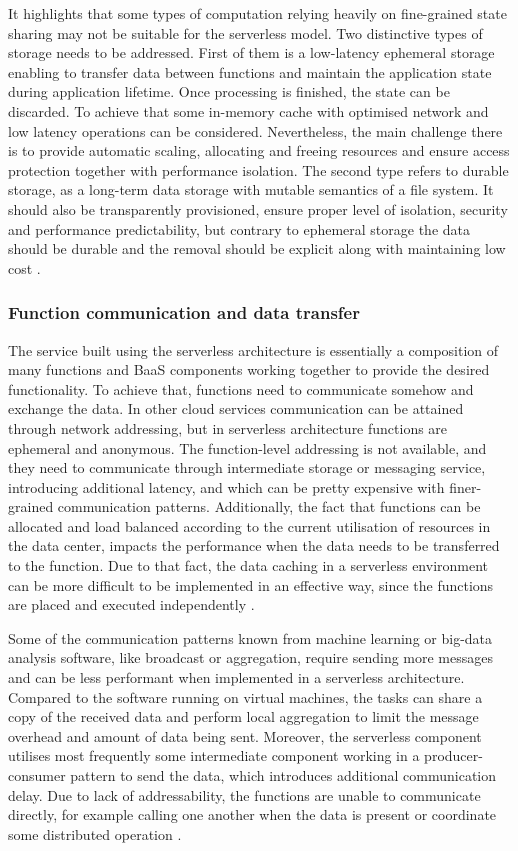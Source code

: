 It highlights that some types of computation relying heavily on fine-grained state sharing may not be suitable for the serverless model. Two distinctive types of storage needs to be addressed. First of them is a low-latency ephemeral storage enabling to transfer data between functions and maintain the application state during application lifetime. Once processing is finished, the state can be discarded. To achieve that some in-memory cache with optimised network and low latency operations can be considered. Nevertheless, the main challenge there is to provide automatic scaling, allocating and freeing resources and ensure access protection together with performance isolation. The second type refers to durable storage, as a long-term data storage with mutable semantics of a file system. It should also be transparently provisioned, ensure proper level of isolation, security and performance predictability, but contrary to ephemeral storage the data should be durable and the removal should be explicit along with maintaining low cost \cite{BerkeleyServerless}.

\subsubsection*{Function communication and data transfer}

The service built using the serverless architecture is essentially a composition of many functions and BaaS components working together to provide the desired functionality. To achieve that, functions need to communicate somehow  and exchange the data. In other cloud services communication can be attained through network addressing, but in serverless architecture functions are ephemeral and anonymous. The function-level addressing is not available, and they need to communicate through intermediate storage or messaging service, introducing additional latency, and which can be pretty expensive with finer-grained communication patterns. Additionally, the fact that functions can be allocated and load balanced according to the current utilisation of resources in the data center, impacts the performance when the data needs to be transferred to the function. Due to that fact, the data caching in a serverless environment can be more difficult to be implemented in an effective way, since the functions are placed and executed independently \cite{ServerlessComputingSurveyOfOpportunitiesChallengesApplications}.

Some of the communication patterns known from machine learning or big-data analysis software, like broadcast or aggregation, require sending more messages and can be less performant when implemented in a serverless architecture. Compared to the software running on virtual machines, the tasks can share a copy of the received data and perform local aggregation to limit the message overhead and amount of data being sent. Moreover, the serverless component utilises most frequently some intermediate component working in a producer-consumer pattern to send the data, which introduces additional communication delay. Due to lack of addressability, the functions are unable to communicate directly, for example calling one another when the data is present or coordinate some distributed operation \cite{BerkeleyServerless}.

